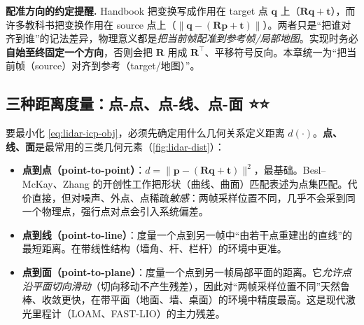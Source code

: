 \begin{note}
\textbf{配准方向的约定提醒.}\;
Handbook 把变换写成作用在 target 点 $\mathbf{q}$ 上（$\mathbf{R}\mathbf{q}+\mathbf{t}$），而许多教科书把变换作用在 source 点上（$\|\mathbf{q}-(\mathbf{R}\mathbf{p}+\mathbf{t})\|$）。两者只是“把谁对齐到谁”的记法差异，物理意义都是\emph{把当前帧配准到参考帧/局部地图}。实现时务必\textbf{自始至终固定一个方向}，否则会把 $\mathbf{R}$ 用成 $\mathbf{R}^\top$、平移符号反向。本章统一为“把当前帧（source）对齐到参考（target/地图）”。
\end{note}

\subsection{三种距离度量：点-点、点-线、点-面 ⭐⭐}
\label{sec:lidar-dist}

要最小化 \cref{eq:lidar-icp-obj}，必须先确定用什么几何关系定义距离 $d(\cdot)$。\textbf{点、线、面}是最常用的三类几何元素\cite{carlone2026handbook}（\cref{fig:lidar-dist}）：

\begin{itemize}
  \item \textbf{点到点（point-to-point）}：$d=\|\mathbf{p}-(\mathbf{R}\mathbf{q}+\mathbf{t})\|^2$，最基础。Besl–McKay\cite{besl1992icp}、Zhang\cite{zhang1994iterative} 的开创性工作把形状（曲线、曲面）匹配表述为点集匹配。代价直接，但对噪声、外点、点稀疏\emph{敏感}：两帧采样位置不同，几乎不会采到同一个物理点，强行点对点会引入系统偏差。
  \item \textbf{点到线（point-to-line）}：度量一个点到另一帧中“由若干点重建出的直线”的最短距离。在带线性结构（墙角、杆、栏杆）的环境中更准。
  \item \textbf{点到面（point-to-plane）}：度量一个点到另一帧局部平面的距离。它\emph{允许点沿平面切向滑动}（切向移动不产生残差），因此对“两帧采样位置不同”天然鲁棒、收敛更快，在带平面（地面、墙、桌面）的环境中精度最高。这是现代激光里程计（LOAM、FAST-LIO）的主力残差。
\end{itemize}

